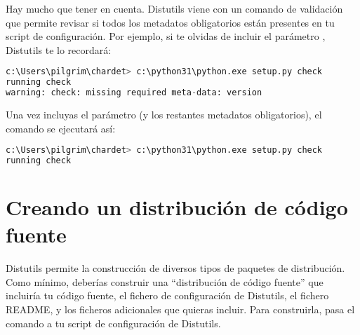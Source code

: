 {Hay mucho que tener en cuenta. Distutils viene con un comando de validación que permite revisar si todos los metadatos obligatorios están presentes en tu script de configuración. Por ejemplo, si te olvidas de incluir el parámetro , Distutils te lo recordará:


\begin{lstlisting}[language=Python,breaklines=true]
c:\Users\pilgrim\chardet> c:\python31\python.exe setup.py check
running check
warning: check: missing required meta-data: version
\end{lstlisting}

Una vez incluyas el parámetro  (y los restantes metadatos obligatorios), el comando  se ejecutará así:


\begin{lstlisting}[language=Python,breaklines=true]
c:\Users\pilgrim\chardet> c:\python31\python.exe setup.py check
running check
\end{lstlisting}

\section{Creando un distribución de código fuente}

Distutils permite la construcción de diversos tipos de paquetes de distribución. Como mínimo, deberías construir una ``distribución de código fuente'' que incluiría tu código fuente, el fichero de configuración de Distutils, el fichero README, y los ficheros adicionales que quieras incluir. Para construirla, pasa el comando  a tu script de configuración de Distutils.


}
